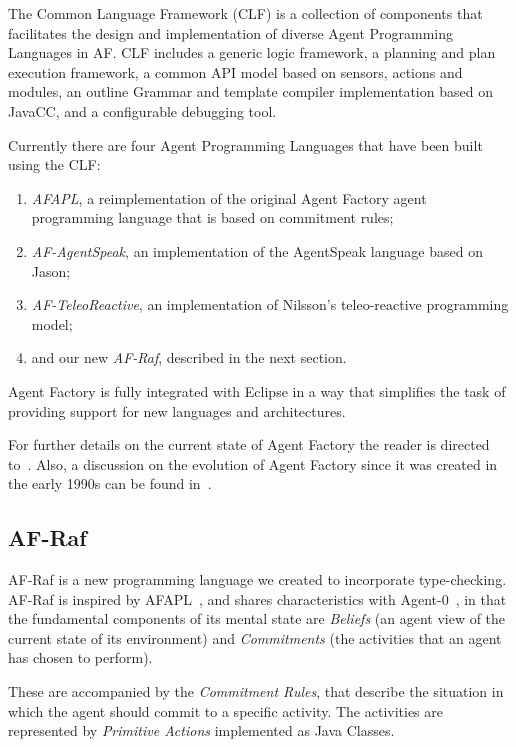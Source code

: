 \documentclass[preprint]{sigplanconf} %
\begin{document}
The Common Language Framework (CLF) is a collection of components that
facilitates the design and implementation of diverse Agent Programming
Languages in AF. CLF includes a generic logic framework, a planning and
plan execution framework, a common API model based on sensors, actions and
modules, an outline Grammar and template compiler implementation based on
JavaCC, and a configurable debugging tool.

Currently there are four Agent Programming Languages that have been built
using the CLF: 
\begin{enumerate}

\item \textit{AFAPL}, a reimplementation of the original Agent Factory
agent programming language that is based on commitment rules;

\item \textit{AF-AgentSpeak}, an implementation of the AgentSpeak language based on Jason;

\item \textit{AF-TeleoReactive}, an implementation of Nilsson's teleo-reactive
programming model; 

\item and our new \textit{AF-Raf}, described in the next section.
\end{enumerate}

Agent Factory is fully integrated with Eclipse in a way that simplifies
the task of providing support for new languages and architectures.

For further details on the current state of Agent Factory the reader is
directed to~\cite{collier2009modeling}. Also, a discussion on the evolution
of Agent Factory since it was created in the early 1990s can be found
in~\cite{muldoon2009towards}.

\subsection{AF-Raf}
AF-Raf is a new programming language we created to incorporate
type-checking. AF-Raf is inspired by AFAPL~\cite{ross2005af}, and shares
characteristics with Agent-0~\cite{DBLP:journals/ai/Shoham93}, in that the
fundamental components of its mental state are \textit{Beliefs} (an agent
view of the current state of its environment) and \textit{Commitments} (the
activities that an agent has chosen to perform).

These are accompanied by the \textit{Commitment Rules}, that describe the
situation in which the agent should commit to a specific activity. The
activities are represented by \textit{Primitive Actions} implemented as
Java Classes.
\end{document}
